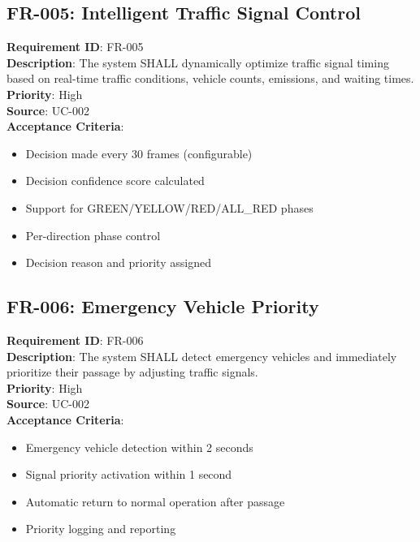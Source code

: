 \documentclass[12pt,a4paper]{article}
\begin{document}
\subsection{FR-005: Intelligent Traffic Signal Control}
\textbf{Requirement ID}: FR-005 \\
\textbf{Description}: The system SHALL dynamically optimize traffic signal timing based on real-time traffic conditions, vehicle counts, emissions, and waiting times. \\
\textbf{Priority}: High \\
\textbf{Source}: UC-002 \\
\textbf{Acceptance Criteria}:
\begin{itemize}
    \item Decision made every 30 frames (configurable)
    \item Decision confidence score calculated
    \item Support for GREEN/YELLOW/RED/ALL\_RED phases
    \item Per-direction phase control
    \item Decision reason and priority assigned
\end{itemize}

\subsection{FR-006: Emergency Vehicle Priority}
\textbf{Requirement ID}: FR-006 \\
\textbf{Description}: The system SHALL detect emergency vehicles and immediately prioritize their passage by adjusting traffic signals. \\
\textbf{Priority}: High \\
\textbf{Source}: UC-002 \\
\textbf{Acceptance Criteria}:
\begin{itemize}
    \item Emergency vehicle detection within 2 seconds
    \item Signal priority activation within 1 second
    \item Automatic return to normal operation after passage
    \item Priority logging and reporting
\end{itemize}
\end{document}
